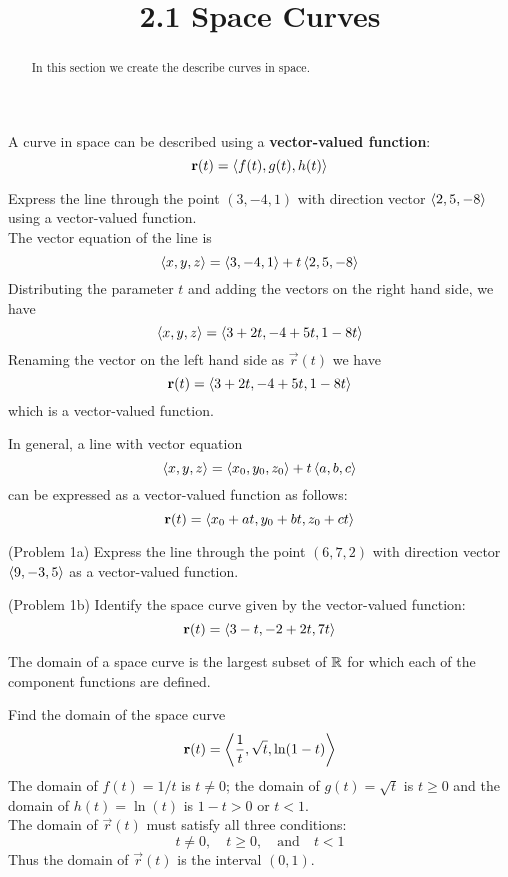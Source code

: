 \documentclass[handout]{ximera}
\title{2.1 Space Curves}
\begin{document}
\begin{abstract}
In this section we create the describe curves in space.
\end{abstract}

\maketitle


A curve in space can be described using a \textbf{vector-valued function}:
\[
\mathbf r(t) = \left\langle f(t), g(t), h(t)\right\rangle
\]

\begin{example}[Example 1]
Express the line through the point $(3, -4, 1)$ with direction vector $\left\langle 2, 5, -8\right\rangle$ using a vector-valued function.\\
The vector equation of the line is 
\[
\left\langle x, y, z\right\rangle = \left\langle 3, -4, 1\right\rangle + t\left\langle 2, 5, -8\right\rangle
\]
Distributing the parameter $t$ and adding the vectors on the right hand side, we have
\[
\left\langle x, y, z\right\rangle = \left\langle 3+2t,-4+ 5t, 1-8t\right\rangle
\]
Renaming the vector on the left hand side as $\vec r(t)$ we have
\[
\mathbf r(t) = \left\langle 3+2t,-4+ 5t, 1-8t\right\rangle
\]
which is a vector-valued function.

\end{example}

\begin{remark}

In general, a line with vector equation
\[
\left\langle x, y, z\right\rangle = \left\langle x_0, y_0, z_0\right\rangle + t\left\langle a, b, c\right\rangle
\]
can be expressed as a vector-valued function as follows:
\[
\mathbf r(t) = \left\langle x_0 + at, y_0 + bt, z_0 + ct\right\rangle
\]
\end{remark}

\begin{problem}(Problem 1a)
Express the line through the point $(6, 7, 2)$ with direction vector $\left\langle 9, -3, 5\right\rangle$ as a vector-valued function.
\end{problem}

\begin{problem}(Problem 1b)
Identify the space curve given by the vector-valued function:
\[
\mathbf r(t) = \left\langle 3 -t, -2 + 2t, 7t\right\rangle
\]
\end{problem}  

The domain of a space curve is the largest subset of $\mathbb R$ for which each of the component functions are defined.

\begin{example}[Example 2]
Find the domain of the space curve
\[
\mathbf r(t) = \left\langle \frac{1}{t}, \sqrt t, \ln(1-t)\right\rangle
\]
 The domain of $f(t) = 1/t$ is $t \neq 0$; the domain of $g(t) = \sqrt t$ is $t \geq 0$ and the domain
 of $h(t) = \ln(t)$ is $1-t > 0$ or $t<1$.\\
 The domain of $\vec r(t)$ must satisfy all three conditions:
 \[
 t\neq 0, \quad t \geq 0, \quad \text{and} \quad t <1
 \]
 Thus the domain of $\vec r(t)$ is the interval $(0, 1)$.
 \end{example}
 
\end{document}
